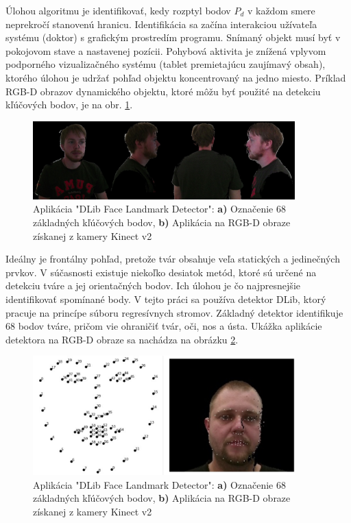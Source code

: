 Úlohou algoritmu je identifikovať, kedy rozptyl bodov $P_d$ v každom smere neprekročí stanovenú hranicu. Identifikácia sa začína interakciou užívateľa systému (doktor) s grafickým prostredím programu. Snímaný objekt musí byť v pokojovom stave a nastavenej pozícii. Pohybová aktivita je znížená vplyvom podporného vizualizačného systému (tablet premietajúcu zaujímavý obsah), ktorého úlohou je udržať pohľad objektu koncentrovaný na jedno miesto. Príklad RGB-D obrazov dynamického objektu, ktoré môžu byť použité na detekciu kľúčových bodov, je na obr. \ref{fig:dlib:views}. 

\begin{figure}[H]
	\centering
	\includegraphics[width=0.9\textwidth]{figures/rgbd_views.png}
	\caption{Aplikácia "DLib Face Landmark Detector":  \textbf{ a)} Označenie 68 základných kľúčových bodov,  \textbf{ b)} Aplikácia na RGB-D obraze získanej z kamery Kinect v2}
	\label{fig:dlib:views}
\end{figure}

Ideálny je frontálny pohľad, pretože tvár obsahuje veľa statických a jedinečných prvkov. V súčasnosti existuje niekoľko desiatok metód, ktoré sú určené na detekciu tváre a jej orientačných bodov. Ich úlohou je čo najpresnejšie identifikovať spomínané body. V tejto práci sa používa detektor DLib, ktorý pracuje na princípe súboru regresívnych stromov.
Základný detektor identifikuje 68 bodov tváre, pričom vie ohraničiť tvár, oči, nos a ústa. Ukážka aplikácie detektora na RGB-D obraze sa nachádza na obrázku \ref{fig:dlib:points}.

\begin{figure}[H]
	\centering
	\includegraphics[width=0.9\textwidth]{figures/face_landmarks.png}
	\caption{Aplikácia "DLib Face Landmark Detector":  \textbf{ a)} Označenie 68 základných kľúčových bodov,  \textbf{ b)} Aplikácia na RGB-D obraze získanej z kamery Kinect v2}
	\label{fig:dlib:points}
\end{figure}
 
